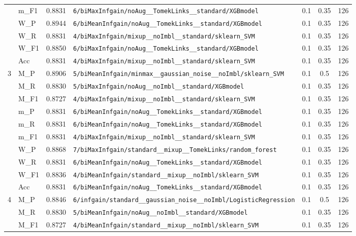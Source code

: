 \begin{table}[htbp]
\begin{tabular}{|c|l|c|>{\ttfamily\footnotesize}p{7.2cm}|c|c|c|}
 & m\_F1 & 0.8831 & \texttt{6/biMaxInfgain/noAug\_\_TomekLinks\_\_standard/XGBmodel} & 0.1 & 0.35  & 126 \\ 
 & W\_P & 0.8944 & \texttt{6/biMeanInfgain/noAug\_\_TomekLinks\_\_standard/XGBmodel} & 0.1 & 0.35  & 126 \\ 
 & W\_R & 0.8831 & \texttt{4/biMaxInfgain/mixup\_\_noImbl\_\_standard/sklearn\_SVM} & 0.1 & 0.35  & 126 \\ 
 & W\_F1 & 0.8850 & \texttt{6/biMaxInfgain/noAug\_\_TomekLinks\_\_standard/XGBmodel} & 0.1 & 0.35  & 126 \\ 
 & Acc & 0.8831 & \texttt{4/biMaxInfgain/mixup\_\_noImbl\_\_standard/sklearn\_SVM} & 0.1 & 0.35  & 126 \\ 
\hline
\multirow{10}{*}{3} & M\_P & 0.8906 & \texttt{5/biMeanInfgain/minmax\_\_gaussian\_noise\_\_noImbl/sklearn\_SVM} & 0.1 & 0.5  & 126 \\ 
 & M\_R & 0.8830 & \texttt{5/biMaxInfgain/noAug\_\_noImbl\_\_standard/XGBmodel} & 0.1 & 0.35  & 126 \\ 
 & M\_F1 & 0.8727 & \texttt{4/biMaxInfgain/mixup\_\_noImbl\_\_standard/sklearn\_SVM} & 0.1 & 0.35  & 126 \\ 
 & m\_P & 0.8831 & \texttt{6/biMeanInfgain/noAug\_\_TomekLinks\_\_standard/XGBmodel} & 0.1 & 0.35  & 126 \\ 
 & m\_R & 0.8831 & \texttt{6/biMeanInfgain/noAug\_\_TomekLinks\_\_standard/XGBmodel} & 0.1 & 0.35  & 126 \\ 
 & m\_F1 & 0.8831 & \texttt{4/biMaxInfgain/mixup\_\_noImbl\_\_standard/sklearn\_SVM} & 0.1 & 0.35  & 126 \\ 
 & W\_P & 0.8868 & \texttt{7/biMaxInfgain/standard\_\_mixup\_\_TomekLinks/random\_forest} & 0.1 & 0.35  & 126 \\ 
 & W\_R & 0.8831 & \texttt{6/biMeanInfgain/noAug\_\_TomekLinks\_\_standard/XGBmodel} & 0.1 & 0.35  & 126 \\ 
 & W\_F1 & 0.8836 & \texttt{4/biMeanInfgain/standard\_\_mixup\_\_noImbl/sklearn\_SVM} & 0.1 & 0.35  & 126 \\ 
 & Acc & 0.8831 & \texttt{6/biMeanInfgain/noAug\_\_TomekLinks\_\_standard/XGBmodel} & 0.1 & 0.35  & 126 \\ 
\hline
\multirow{10}{*}{4} & M\_P & 0.8846 & \texttt{6/infgain/standard\_\_gaussian\_noise\_\_noImbl/LogisticRegression} & 0.1 & 0.5  & 126 \\ 
 & M\_R & 0.8830 & \texttt{5/biMeanInfgain/noAug\_\_noImbl\_\_standard/XGBmodel} & 0.1 & 0.35  & 126 \\ 
 & M\_F1 & 0.8727 & \texttt{4/biMeanInfgain/standard\_\_mixup\_\_noImbl/sklearn\_SVM} & 0.1 & 0.35  & 126 \\ 

\end{tabular}
\end{table}
